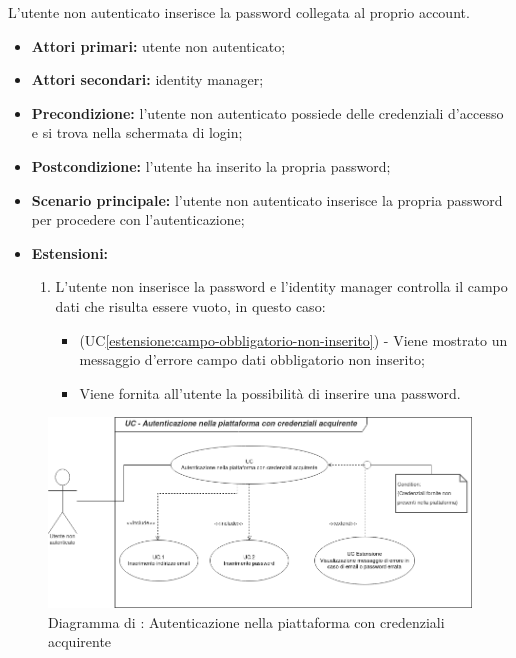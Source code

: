 \label{autenticazione-venditore.modulo.password}

L'utente non autenticato inserisce la password collegata al proprio account.
\begin{itemize}
	\item \textbf{Attori primari:} utente non autenticato;
	\item \textbf{Attori secondari:} identity manager;
	\item \textbf{Precondizione:} l'utente non autenticato possiede delle credenziali d'accesso e si trova nella schermata di login;
	\item \textbf{Postcondizione:} l'utente ha inserito la propria password;
	\item \textbf{Scenario principale:} l'utente non autenticato inserisce la propria password per procedere con l'autenticazione;
	\item \textbf{Estensioni:} 
	\begin{enumerate}[label=\lett]
		\item L'utente non inserisce la password e l'identity manager controlla il campo dati che risulta essere vuoto, in questo caso:
		\begin{itemize}
			\item (UC\ref{estensione:campo-obbligatorio-non-inserito}) - Viene mostrato un messaggio d'errore campo dati obbligatorio non inserito;
			\item Viene fornita all'utente la possibilità di inserire una password.
		\end{itemize}
	\end{enumerate}
\end{itemize}

\label{autenticazione-acquirente}

\begin{figure}[H]
	\centering
	\includegraphics[scale=0.6]{Immagini/DiagrammiUC/AccessoAcquirente.png}
	\caption{Diagramma di \actualUC: Autenticazione nella piattaforma con credenziali acquirente} 
	\label{fig:LoginAcquirente}
\end{figure}

